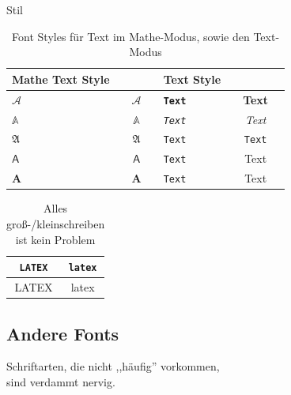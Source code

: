 \documentclass[14pt,aspectratio=169]{beamer}
\begin{document}
\begin{frame}{\insertsubsection \quad\small Stil}
    \begin{table}
        \begin{tabular}{l|c||l|c}
            Mathe Text Style & & Text Style & \\
            \hline
            \texttt{$\mathcal{A}$}  & ~~$\mathcal{A}$~~   
            & \texttt{\textbf{Text}}  & ~~\textbf{Text}~~  \\
            \texttt{$\mathbb{A}$}   & ~~$\mathbb{A}$~~    
            & \texttt{\textit{Text}}  & ~~\textit{Text}~~  \\
            \texttt{$\mathfrak{A}$} & ~~$\mathfrak{A}$~~  
            & \texttt{\texttt{Text}}  & ~~\texttt{Text}~~  \\
            \texttt{$\mathsf{A}$}   & ~~$\mathsf{A}$~~    
            & \texttt{\textsf{Text}}  & ~~\textsf{Text}~~ \\
            \texttt{$\mathbf{A}$}   & ~~$\mathbf{A}$~~    
            & \texttt{\textrm{Text}}  & ~~\textrm{Text}~~  \\
        \end{tabular}
        \caption{Font Styles für Text im Mathe-Modus, sowie den Text-Modus}
    \end{table}
    \vspace{-1em}
    \begin{table}
        \begin{tabular}{c|c}
            \texttt{\uppercase{LaTeX}} & \texttt{\lowercase{LaTeX}} \\
            \hline
            \uppercase{LaTeX}                   & \lowercase{LaTeX}
        \end{tabular}
        \caption{Alles groß-/kleinschreiben ist kein Problem}
    \end{table}
\end{frame}


\subsection{Andere Fonts}

\begin{frame}{\insertsubsection}
    \Large\emph{\faQuoteLeft}
    Schriftarten, die nicht ,,häufig'' vorkommen, \\ 
    \textcolor{white}{\faQuoteLeft} sind verdammt nervig. 
\end{frame}
\end{document}
